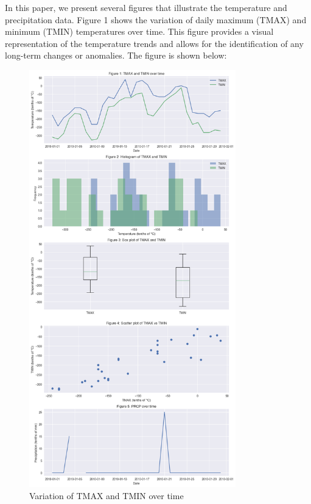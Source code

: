 \documentclass{article}
\begin{document}
In this paper, we present several figures that illustrate the temperature and precipitation data. Figure 1 shows the variation of daily maximum (TMAX) and minimum (TMIN) temperatures over time. This figure provides a visual representation of the temperature trends and allows for the identification of any long-term changes or anomalies. The figure is shown below:

\begin{figure}[h]
  \centering
  \includegraphics[width=0.8\textwidth]{figure_0.png}
  \caption{Variation of TMAX and TMIN over time}
  \label{fig:temp_over_time}
\end{figure}
\end{document}
